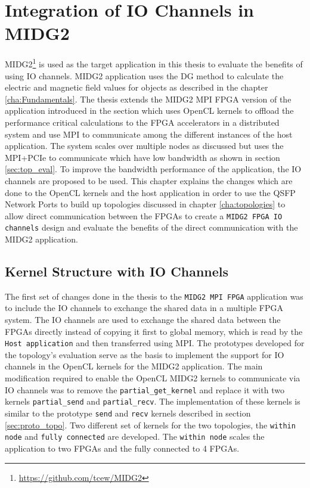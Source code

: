 \chapter{Integration of IO Channels in MIDG2}
\label{cha:sys_arch}

MIDG2\footnote{\url{https://github.com/tcew/MIDG2}} is used as the target
application in this thesis to evaluate the benefits of using IO channels.
MIDG2 application uses the \ac{DG} method to calculate the electric and magnetic
field values for objects as described in the chapter \ref{cha:Fundamentals}.
The thesis extends the MIDG2 \ac{MPI} FPGA version of the application introduced in the
section \label{sec:midge_mpi} which uses OpenCL kernels to
offload the performance critical calculations to the FPGA accelerators in a
distributed system and use MPI to communicate among the different instances of the
host application. The system scales over multiple nodes as discussed but
uses the \ac{MPI}+PCIe to communicate which have low bandwidth as shown in section
\ref{sec:top_eval}. To improve the bandwidth performance of the application,
the IO channels are proposed to be used. This chapter explains the changes
which are done to the OpenCL kernels and the host application in order to use
the QSFP Network Ports to build up topologies discussed in chapter
\ref{cha:topologies} to allow direct communication between the FPGAs to create a
\texttt{MIDG2 FPGA IO channels} design
and evaluate the benefits of the direct communication with the MIDG2 application.

\section{Kernel Structure with IO Channels}
\label{sec:struc_iochan}

The first set of changes done in the thesis to the \texttt{MIDG2 MPI FPGA} application
was to include the IO channels to exchange the shared data in a multiple FPGA system.
The IO channels are used to exchange the shared data between the FPGAs directly instead
of copying it first to global memory, which is read by the \texttt{Host application}
and then transferred using MPI. The prototypes developed for the topology's evaluation
serve as the basis to implement the support for IO channels in the OpenCL kernels for
the MIDG2 application. The main modification required to enable the OpenCL MIDG2
kernels to communicate via IO channels
was to remove the \texttt{partial\_get\_kernel} and replace it with two kernels
\texttt{partial\_send} and \texttt{partial\_recv}. The implementation of these kernels
is similar to the prototype \texttt{send} and \texttt{recv} kernels described in
section \ref{sec:proto_topo}. Two different set of kernels for the two topologies,
the \texttt{within node} and \texttt{fully connected} are developed. The \texttt{within node}
scales the application to two FPGAs and the fully connected to 4 FPGAs.

